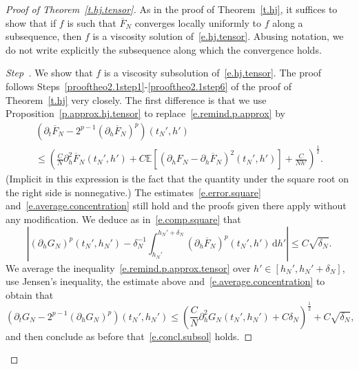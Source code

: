 \documentclass[AHL,Unicode,longabstracts,published]{cedram}
\newcommand{\E}{\mathbb{E}}
\renewcommand{\d}{\mathrm{d}}
\newcommand{\1}{\mathds{1}}
\renewcommand{\le}{\leqslant}
\renewcommand{\bar}{\overline}
\newcommand{\de}{\delta}
\newcounter{stepcount}
\newenvironment{step}{\refstepcounter{stepcount}\begin{proof}[Step~\thestepcount]}{\let\qed\relax\end{proof}}
\begin{document}
\begin{proof}[Proof of Theorem~\ref{t.hj.tensor}]
As in the proof of Theorem~\ref{t.hj}, it suffices to show that if $f$ is such that $\bar F_N$ converges locally uniformly to $f$ along a subsequence, then $f$ is a viscosity solution of~\eqref{e.hj.tensor}. Abusing notation, we do not write explicitly the subsequence along which the convergence holds.



\setcounter{stepcount}{0}
\begin{step}
We show that $f$ is a viscosity subsolution of~\eqref{e.hj.tensor}. The proof follows Steps~\ref{prooftheo2.1step1}-\ref{prooftheo2.1step6} of the proof of Theorem~\ref{t.hj} very closely. The first difference is that we use Proposition~\ref{p.approx.hj.tensor} to replace~\eqref{e.remind.p.approx} by
\begin{multline}\label{e.remind.p.approx.tensor}
\left(\partial_t \bar F_N - 2^{p-1} (\partial_h \bar F_N)^p \right)\left(t_N',h'\right)
\\
\le
\left(\frac C {N} \partial_{h}^2 \bar F_N\left(t_N',h'\right) + C \E \left[\left(\partial_h F_N - \partial_h \bar F_N\right)^2(t_N',h') \right] +\frac{C}{Nh'}\right)^\frac 1 2.
\end{multline}
(Implicit in this expression is the fact that the quantity under the square root on the right side is nonnegative.) The estimates~\eqref{e.error.square} and~\eqref{e.average.concentration} still hold and the proofs given there apply without any modification. We deduce as in~\eqref{e.comp.square} that
\[
\left|\left(\partial_h G_N\right)^p\left(t_N',h_N'\right) - \de_N^{-1}\int_{h_N'}^{h_N' + \de_N} \left(\partial_h \bar F_N\right)^p\left(t_N',h'\right) \, \d h' \right|
\le C \sqrt{\de_N}.
\]
We average the inequality~\eqref{e.remind.p.approx.tensor} over $h' \in [h_N',h_N' + \de_N]$, use Jensen's inequality, the estimate above and~\eqref{e.average.concentration} to obtain that
\[
\left(\partial_t G_N - 2^{p-1} \left(\partial_h G_N\right)^p \right)(t_N',h_N')
\le
\left(\frac C {N} \partial_{h}^2 G_N\left(t_N',h_N'\right) + C \de_N \right)^\frac 1 2 + C \sqrt{\de_N},
\]
and then conclude as before that~\eqref{e.concl.subsol} holds.
\end{step}\label{prooftheo5.1Step1}


\end{proof}
\end{document}
